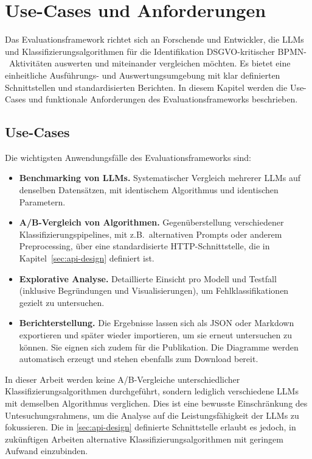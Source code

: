 \section{Use-Cases und Anforderungen}\label{sec:anforderungen-und-use-cases}

Das Evaluationsframework richtet sich an Forschende und Entwickler, die \acp{LLM} und Klassifizierungsalgorithmen für die Identifikation \ac{DSGVO}-kritischer \ac{BPMN}-\linebreak~Aktivitäten auswerten und miteinander vergleichen möchten. Es bietet eine einheitliche Ausführungs- und Auswertungsumgebung mit klar definierten Schnittstellen und standardisierten Berichten. In diesem Kapitel werden die Use-Cases und funktionale Anforderungen des Evaluationsframeworks beschrieben.

\subsection*{Use-Cases}

Die wichtigsten Anwendungsfälle des Evaluationsframeworks sind:

\begin{itemize}
    \item \textbf{Benchmarking von \acp{LLM}.} Systematischer Vergleich mehrerer \acp{LLM} auf denselben Datensätzen, mit identischem Algorithmus und identischen Parametern.
    \item \textbf{A/B-Vergleich von Algorithmen.} Gegenüberstellung verschiedener Klassifizierungspipelines, mit z.B.\ alternativen Prompts oder anderem Preprocessing, über eine standardisierte HTTP-Schnittstelle, die in Kapitel~\ref{sec:api-design} definiert ist.
    \item \textbf{Explorative Analyse.} Detaillierte Einsicht pro Modell und Testfall (inklusive Begründungen und Visualisierungen), um Fehlklassifikationen gezielt zu untersuchen.
    \item \textbf{Berichterstellung.} Die Ergebnisse lassen sich als JSON oder Markdown exportieren und später wieder importieren, um sie erneut untersuchen zu können. Sie eignen sich zudem für die Publikation. Die Diagramme werden automatisch erzeugt und stehen ebenfalls zum Download bereit.
\end{itemize}

In dieser Arbeit werden keine A/B-Vergleiche unterschiedlicher Klassifizierungsalgorithmen durchgeführt, sondern lediglich verschiedene \acp{LLM} mit demselben Algorithmus verglichen. Dies ist eine bewusste Einschränkung des Untesuchungsrahmens, um die Analyse auf die Leistungsfähigkeit der \acp{LLM} zu fokussieren. Die in \ref{sec:api-design} definierte Schnittstelle erlaubt es jedoch, in zukünftigen Arbeiten alternative Klassifizierungsalgorithmen mit geringem Aufwand einzubinden.

